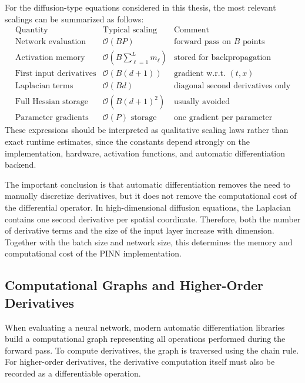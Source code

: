 For the diffusion-type equations considered in this thesis, the most relevant scalings can be summarized as follows:
\[
\begin{array}{c|c|c}
\text{Quantity} & \text{Typical scaling} & \text{Comment} \\
\hline
\text{Network evaluation} & \mathcal{O}(BP) & \text{forward pass on } B \text{ points} \\
\text{Activation memory} & \mathcal{O}\left(B\sum_{\ell=1}^{L}m_\ell\right) & \text{stored for backpropagation} \\
\text{First input derivatives} & \mathcal{O}(B(d+1)) & \text{gradient w.r.t. } (t,x) \\
\text{Laplacian terms} & \mathcal{O}(Bd) & \text{diagonal second derivatives only} \\
\text{Full Hessian storage} & \mathcal{O}(B(d+1)^2) & \text{usually avoided} \\
\text{Parameter gradients} & \mathcal{O}(P) \text{ storage} & \text{one gradient per parameter}
\end{array}
\]
These expressions should be interpreted as qualitative scaling laws rather than exact runtime estimates, since the constants depend strongly on the implementation, hardware, activation functions, and automatic differentiation backend.

The important conclusion is that automatic differentiation removes the need to manually discretize derivatives, but it does not remove the computational cost of the differential operator. In high-dimensional diffusion equations, the Laplacian contains one second derivative per spatial coordinate. Therefore, both the number of derivative terms and the size of the input layer increase with dimension. Together with the batch size and network size, this determines the memory and computational cost of the PINN implementation.

\subsection{Computational Graphs and Higher-Order Derivatives}

When evaluating a neural network, modern automatic differentiation libraries build a computational graph representing all operations performed during the forward pass. To compute derivatives, the graph is traversed using the chain rule. For higher-order derivatives, the derivative computation itself must also be recorded as a differentiable operation.

